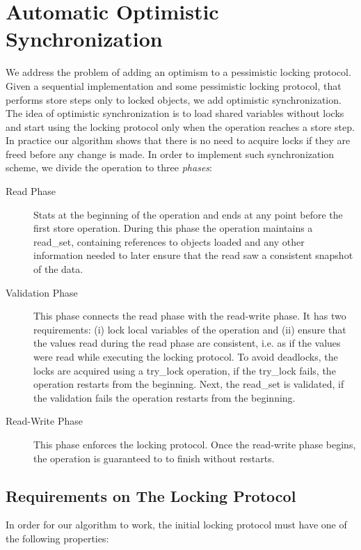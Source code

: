 \documentclass{article}
\newcommand{\code}[1]{\textsf{#1}}
\newcommand{\readSet}{\code{read\_set}\xspace}
\begin{document}
\section{Automatic Optimistic Synchronization}
We address the problem of adding an 
optimism to a pessimistic locking protocol. 
Given a sequential implementation and some pessimistic
locking protocol, that performs store steps 
only to locked objects,
we add optimistic synchronization. 
The idea of optimistic synchronization is to load 
shared variables without locks and start using the 
locking protocol only when the operation reaches a store step.
In practice our algorithm shows that there is no need to 
acquire locks if they are freed before any change is made.    
In order to implement such synchronization scheme, 
we divide the operation to three \emph{phases}:
\begin{description}
  \item[Read Phase] Stats at the beginning of the operation and
  ends at any point before the first store operation. 
  During this phase the operation maintains a \readSet, containing references to
  objects loaded and any other information needed to later ensure that the read saw 
  a consistent snapshot of the data. 
  
  \item[Validation Phase] This phase connects the read phase
  with the read-write phase. It has two requirements: (i) lock 
  local variables of the operation and (ii) ensure that the 
  values read during the read phase are consistent, i.e.
  as if the values were read while executing the locking 
  protocol. To avoid deadlocks, the locks are acquired using 
  a \code{try\_lock} operation, if the \code{try\_lock} fails, 
  the operation restarts from the beginning. Next, the \readSet 
  is validated, if the validation fails the operation restarts from the
  beginning.
  
  \item[Read-Write Phase] This phase enforces the locking protocol. 
  Once the read-write phase begins, the operation is guaranteed to to 
  finish without restarts.  
\end{description}

\subsection{Requirements on The Locking Protocol}
In order for our algorithm to work, the initial locking
protocol must have one of the following properties: 
\end{document}
